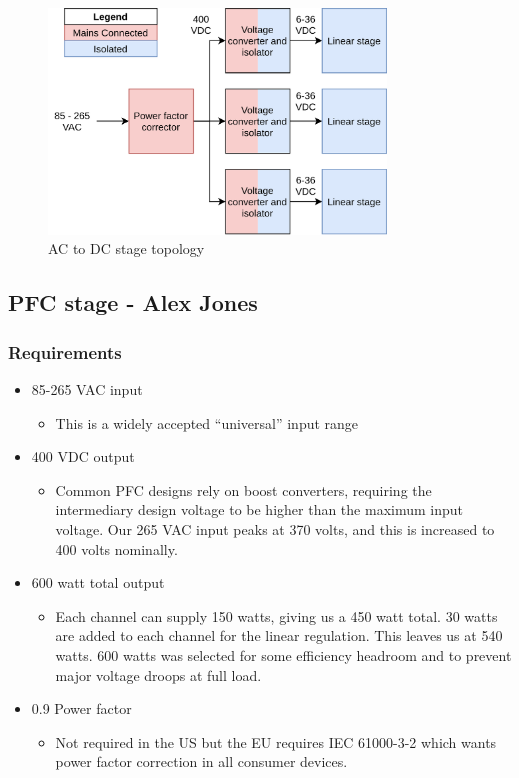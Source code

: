 \documentclass[15pt]{article}
\begin{document}
\begin{figure}[H]
    \centering
    \includegraphics[width=0.8\textwidth]{acdctopo}
    \caption{AC to DC stage topology}
    \label{fig:acdctopo}
\end{figure}

\subsection{PFC stage  - Alex Jones}
\subsubsection{Requirements}
\begin{itemize}
\item 85-265 VAC input \begin{itemize}
    \item This is a widely accepted “universal” input range
\end{itemize}
\item 400 VDC output \begin{itemize}
    \item Common PFC designs rely on boost converters, requiring the intermediary design voltage to be higher than the maximum input voltage. Our 265 VAC input peaks at 370 volts, and this is increased to 400 volts nominally.
\end{itemize}
\item 600 watt total output \begin{itemize}
    \item Each channel can supply 150 watts, giving us a 450 watt total. 30 watts are added to each channel for the linear regulation. This leaves us at 540 watts. 600 watts was selected for some efficiency headroom and to prevent major voltage droops at full load.
\end{itemize}
\item 0.9 Power factor \begin{itemize}
    \item Not required in the US but the EU requires IEC 61000-3-2\cite{4} which wants power factor correction in all consumer devices. 
\end{itemize}
\end{itemize}
\end{document}
